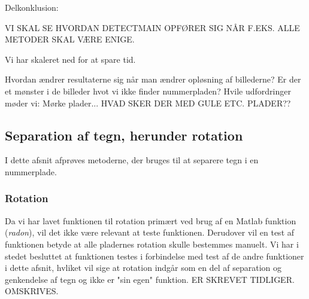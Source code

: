 \begin{comment} %
\subsubsection*{Observeret sæt på 407 billeder}
Scale: 0.25
DetectMain: 96.6/99.24
DetectQuant: 67.8/75.4
DetectSameness: 56.8/95.5
DetectContrastAvg: 62.7/85.0
DetectPlateness: 50.4/65.5
DetectCStretch: 84.0/92.7

Scale: 0.50 (Ekstremt langsomt)
DetectPlateness: 29.7/56.5
DetectCStretch:
\end{comment}


Delkonklusion:

VI SKAL SE HVORDAN DETECTMAIN OPFØRER SIG NÅR F.EKS. ALLE METODER SKAL VÆRE ENIGE.

Vi har skaleret ned for at spare tid.

Hvordan ændrer resultaterne sig når man ændrer opløsning af billederne?
Er der et mønster i de billeder hvot vi ikke finder nummerpladen? Hvile udfordringer møder vi: Mørke plader... 
HVAD SKER DER MED GULE ETC. PLADER??



\subsection{Separation af tegn, herunder rotation}


I dette afsnit afprøves metoderne, der bruges til at separere tegn i en nummerplade.

\subsubsection*{Rotation}

Da vi har lavet funktionen til rotation primært ved brug af en Matlab funktion (\textit{radon}), vil det ikke være relevant at teste funktionen. Derudover vil en test af funktionen betyde at alle pladernes rotation skulle bestemmes manuelt. Vi har i stedet besluttet at funktionen testes i forbindelse med test af de andre funktioner i dette afsnit, hvliket vil sige at rotation indgår som en del af separation og genkendelse af tegn og ikke er "sin egen" funktion. ER SKREVET TIDLIGER. OMSKRIVES.


